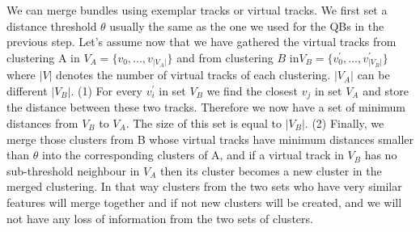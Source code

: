 \documentclass[preprint,authoryear,a4paper,10pt,onecolumn]{elsarticle}
\begin{document}
We can merge bundles using exemplar tracks or virtual tracks. We first
set a distance threshold $\theta$ usually the same as the one we used
for the QBs in the previous step. Let's assume now that we have gathered
the virtual tracks from clustering A in
$V_{A}=\{v_{0},...,v_{|V_{A}|}\}$ and from clustering $B$
in$V_{B}=\{v_{0}^{'},...,v_{|V_{B}|}^{'}\}$ where $|V|$ denotes the
number of virtual tracks of each clustering.  $|V_{A}|$ can be different
$|V_{B}|$. (1) For every $v_{i}^{'}$ in set $V_{B}$ we find the closest
$v_{j}$ in set $V_{A}$ and store the distance between these two
tracks. Therefore we now have a set of minimum distances from $V_{B}$ to
$V_{A}$. The size of this set is equal to $|V_{B}|$. (2) Finally, we
merge those clusters from B whose virtual tracks have minimum
distances smaller than $\theta$ into the corresponding clusters of A,
and if a virtual track in $V_{B}$ has no sub-threshold neighbour in
$V_{A}$ then its cluster becomes a new cluster in the merged
clustering. In that way clusters from the two sets who have very similar
features will merge together and if not new clusters will be created,
and we will not have any loss of information from the two sets of
clusters.





\end{document}
